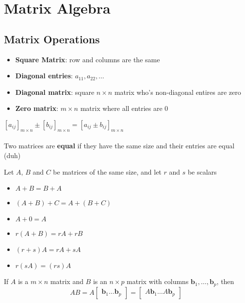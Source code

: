 \documentclass{report}
\begin{document}
\chapter{Matrix Algebra}

\section{Matrix Operations}
\begin{itemize}
    \item \textbf{Square Matrix}: row and columns are the same
    \item \textbf{Diagonal entries}: $a_{11}, a_{22}, \ldots$
    \item \textbf{Diagonal matrix}: square $n \times n$ matrix who's non-diagonal entires are zero
    \item \textbf{Zero matrix}: $m \times n$ matrix where all entries are 0
\end{itemize}

$\left[ a_{ij} \right]_{m \times n} \pm \left[ b_{ij} \right]_{m \times n} = \left[ a_{ij} \pm b_{ij} \right]_{m \times n}$
\\\\
Two matrices are \textbf{equal} if they have the same size and their entries are equal (duh)

\setcounter{theorem}{0}
\setcounter{definition}{0}
\begin{theorem}
\end{theorem}
\begin{tcolorbox}[colback=blue!5!white, colframe=blue!75!black, title=Properties of Matrices]
Let $A$, $B$ and $C$ be matrices of the same size, and let $r$ and $s$ be scalars
\begin{itemize}
    \item $A + B = B + A$
    \item $(A + B) + C = A + (B + C)$
    \item $A + 0 = A$
    \item $r(A + B) = rA + rB$
    \item $(r + s)A = rA + sA$
    \item $r(sA) = (rs)A$
\end{itemize}
\end{tcolorbox}

\begin{definition}
    If $A$ is a $m \times n$ matrix and $B$ is an $n \times p$ matrix with columns
$\mathbf{b}_1, \ldots, \mathbf{b}_p$, then 
\[
AB = A\begin{bmatrix}\mathbf{b}_1 \ldots \mathbf{b}_p\end{bmatrix}
    = \begin{bmatrix}A\mathbf{b}_1 \ldots A\mathbf{b}_p\end{bmatrix}
\]
\end{definition}
\end{document}
